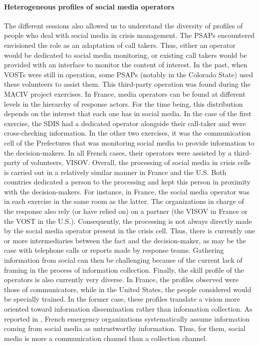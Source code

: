 \paragraph{Heterogeneous profiles of social media operators}
The different sessions also allowed us to understand the diversity of profiles of people who deal with social media in crisis management.
The PSAPs encountered envisioned the role as an adaptation of call takers.
Thus, either an operator would be dedicated to social media monitoring, or existing call takers would be provided with an interface to monitor the content of interest.
In the past, when VOSTs were still in operation, some PSAPs (notably in the Colorado State) used these volunteers to assist them.
This third-party operation was found during the MACIV project exercises.
In France, media operators can be found at different levels in the hierarchy of response actors.
For the time being, this distribution depends on the interest that each one has in social media.
In the case of the first exercise, the SDIS had a dedicated operator alongside their call-taker and were cross-checking information.
In the other two exercises, it was the communication cell of the Prefectures that was monitoring social media to provide information to the decision-makers.
In all French cases, their operators were assisted by a third-party of volunteers, VISOV.
Overall, the processing of social media in crisis cells is carried out in a relatively similar manner in France and the U.S.
Both countries dedicated a person to the processing and kept this person in proximity with the decision-makers.
For instance, in France, the social media operator was in each exercise in the same room as the latter.
The organizations in charge of the response also rely (or have relied on) on a partner (the VISOV in France or the VOST in the U.S.).
Consequently, the processing is not always directly made by the social media operator present in the crisis cell.
Thus, there is currently one or more intermediaries between the fact and the decision-maker, as may be the case with telephone calls or reports made by response teams.
Gathering information from social can then be challenging because of the current lack of framing in the process of information collection.
Finally, the skill profile of the operators is also currently very diverse.
In France, the profiles observed were those of communicators, while in the United States, the people considered would be specially trained.
In the former case, these profiles translate a vision more oriented toward information dissemination rather than information collection.
As reported in \textcite{castagninoWhatCanWe2019}, French emergency organizations systematically assume information coming from social media as untrustworthy information.
Thus, for them, social media is more a communication channel than a collection channel.


